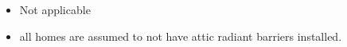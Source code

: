 \begin{itemize}
\item Not applicable
\item all homes are assumed to not have attic radiant barriers installed.
\end{itemize}
